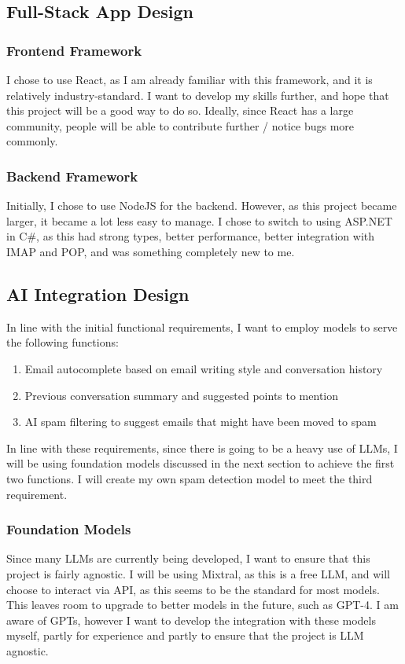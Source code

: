 \documentclass[../main.tex]{subfiles}
\begin{document}
\subsection{Full-Stack App Design}
\subsubsection{Frontend Framework}
I chose to use React, as I am already familiar with this framework, and it is relatively industry-standard. I want to develop my skills further, and hope that this project will be a good way to do so. Ideally, since React has a large community, people will be able to contribute further / notice bugs more commonly.

\subsubsection{Backend Framework}
Initially, I chose to use NodeJS for the backend. However, as this project became larger, it became a lot less easy to manage. I chose to switch to using ASP.NET in C\#, as this had strong types, better performance, better integration with IMAP and POP, and was something completely new to me.

\subsection{AI Integration Design}
In line with the initial functional requirements, I want to employ models to serve the following functions:
\begin{enumerate}
    \item Email autocomplete based on email writing style and conversation history
    \item Previous conversation summary and suggested points to mention
    \item AI spam filtering to suggest emails that might have been moved to spam
\end{enumerate}
In line with these requirements, since there is going to be a heavy use of LLMs, I will be using foundation models discussed in the next section to achieve the first two functions. I will create my own spam detection model to meet the third requirement.

\subsubsection{Foundation Models}
Since many LLMs are currently being developed, I want to ensure that this project is fairly agnostic. I will be using Mixtral, as this is a free LLM, and will choose to interact via API, as this seems to be the standard for most models. This leaves room to upgrade to better models in the future, such as GPT-4. I am aware of GPTs, however I want to develop the integration with these models myself, partly for experience and partly to ensure that the project is LLM agnostic.
\end{document}
